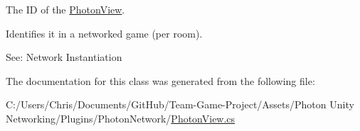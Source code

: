 The ID of the \hyperlink{class_photon_view}{Photon\+View}. 

Identifies it in a networked game (per room). 

See\+: Network Instantiation

The documentation for this class was generated from the following file\+:\begin{DoxyCompactItemize}
\item 
C\+:/\+Users/\+Chris/\+Documents/\+Git\+Hub/\+Team-\/\+Game-\/\+Project/\+Assets/\+Photon Unity Networking/\+Plugins/\+Photon\+Network/\hyperlink{_photon_view_8cs}{Photon\+View.\+cs}\end{DoxyCompactItemize}
